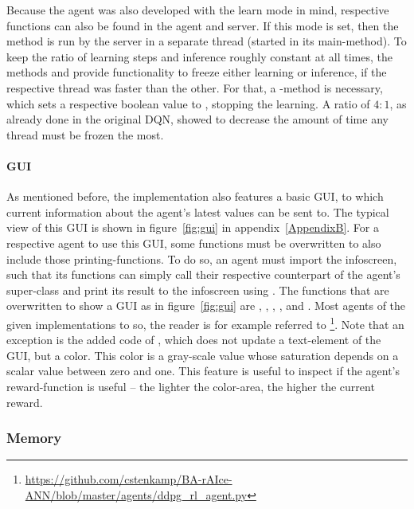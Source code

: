 Because the agent was also developed with the learn mode  in mind, respective functions can also be found in the agent and server. If this mode is set, then the method  is run by the server in a separate thread (started in its main-method). To keep the ratio of learning steps and inference roughly constant at all times, the methods  and  provide functionality to freeze either learning or inference, if the respective thread was faster than the other. For that, a -method is necessary, which sets a respective boolean value to , stopping the learning. A ratio of $4:1$, as already done in the original DQN, showed to decrease the amount of time any thread must be frozen the most.


\paragraph{GUI}
\label{paragraph:gui}

As mentioned before, the implementation also features a basic GUI, to which current information about the agent's latest values can be sent to. The typical view of this GUI is shown in figure~\ref{fig:gui} in appendix~\ref{AppendixB}. For a respective agent to use this GUI, some functions must be overwritten to also include those printing-functions. To do so, an agent must import the infoscreen, such that its functions can simply call their respective counterpart of the agent's super-class and print its result to the infoscreen using . The functions that are overwritten to show a GUI as in figure~\ref{fig:gui} are , , , ,  and . Most agents of the given implementations to so, the reader is for example referred to \footnote{\url{https://github.com/cstenkamp/BA-rAIce-ANN/blob/master/agents/ddpg_rl_agent.py}}. Note that an exception is the added code of , which does not update a text-element of the GUI, but a color. This color is a gray-scale value whose saturation depends on a scalar value between zero and one. This feature is useful to inspect if the agent's reward-function is useful -- the lighter the color-area, the higher the current reward.

\subsubsection{Memory}

